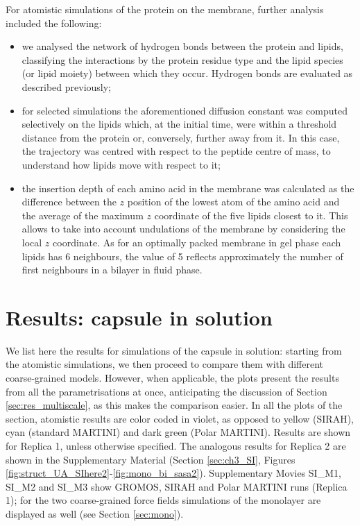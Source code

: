 For atomistic simulations of the protein on the membrane, further analysis included the following:
\begin{itemize}
\item we analysed the network of hydrogen bonds between the protein and lipids, classifying the interactions by the protein residue type and the lipid species (or lipid moiety) between which they occur. Hydrogen bonds are evaluated as described previously;
\item for selected simulations the aforementioned diffusion constant was computed selectively on the lipids which, at the initial time, were within a threshold distance from the protein or, conversely, further away from it. In this case, the trajectory was centred with respect to the peptide centre of mass, to understand how lipids move with respect to it;
\item the insertion depth of each amino acid in the membrane was calculated as the difference between the $z$ position of the lowest atom of the amino acid and the average of the maximum $z$ coordinate of the five lipids closest to it. This allows to take into account undulations of the membrane by considering the local $z$ coordinate. As for an optimally packed membrane in gel phase each lipids has 6 neighbours, the value of 5 reflects approximately the number of first neighbours in a bilayer in fluid phase.
\end{itemize}

\section{Results: capsule in solution} \label{sec:results_cap}
We list here the results for simulations of the capsule in solution: starting from the atomistic simulations, we then proceed to compare them with different coarse-grained models. However, when applicable, the plots present the results from all the parametrisations at once, anticipating the discussion of Section \ref{sec:res_multiscale}, as this makes the comparison easier. In all the plots of the section, atomistic results are color coded in violet, as opposed to yellow (SIRAH), cyan (standard MARTINI) and dark green (Polar MARTINI). Results are shown for Replica 1, unless otherwise specified. The analogous results for Replica 2 are shown in the Supplementary Material (Section \ref{sec:ch3_SI}, Figures \ref{fig:struct_UA_SIhere2}-\ref{fig:mono_bi_sasa2}). Supplementary Movies SI\_M1, SI\_M2 and SI\_M3 show GROMOS, SIRAH and Polar MARTINI runs (Replica 1); for the two coarse-grained force fields simulations of the monolayer are displayed as well (see Section \ref{sec:mono}).

